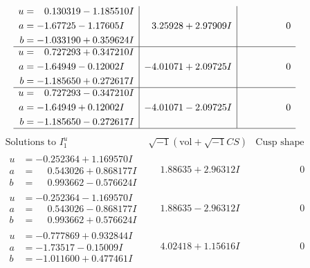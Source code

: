 \documentclass[1p]{elsarticle_modified}
\theoremstyle{definition}
\newcommand{\I}{\sqrt{-1}}
\begin{document}
$$\begin{array}{c|c|c}
\begin{aligned}
u &= \phantom{-}0.130319 - 1.185510 I \\
a &= -1.67725 - 1.17605 I \\
b &= -1.033190 + 0.359624 I\end{aligned}
 & \phantom{-}3.25928 + 2.97909 I & \phantom{-0.000000 } 0 \\ \hline\begin{aligned}
u &= \phantom{-}0.727293 + 0.347210 I \\
a &= -1.64949 - 0.12002 I \\
b &= -1.185650 + 0.272617 I\end{aligned}
 & -4.01071 + 2.09725 I & \phantom{-0.000000 } 0 \\ \hline\begin{aligned}
u &= \phantom{-}0.727293 - 0.347210 I \\
a &= -1.64949 + 0.12002 I \\
b &= -1.185650 - 0.272617 I\end{aligned}
 & -4.01071 - 2.09725 I & \phantom{-0.000000 } 0\\
 \hline 
 \end{array}$$\newpage$$\begin{array}{c|c|c}  
\text{Solutions to }I^u_{1}& \I (\text{vol} + \sqrt{-1}CS) & \text{Cusp shape}\\
 \hline 
\begin{aligned}
u &= -0.252364 + 1.169570 I \\
a &= \phantom{-}0.543026 + 0.868177 I \\
b &= \phantom{-}0.993662 - 0.576624 I\end{aligned}
 & \phantom{-}1.88635 + 2.96312 I & \phantom{-0.000000 } 0 \\ \hline\begin{aligned}
u &= -0.252364 - 1.169570 I \\
a &= \phantom{-}0.543026 - 0.868177 I \\
b &= \phantom{-}0.993662 + 0.576624 I\end{aligned}
 & \phantom{-}1.88635 - 2.96312 I & \phantom{-0.000000 } 0 \\ \hline\begin{aligned}
u &= -0.777869 + 0.932844 I \\
a &= -1.73517 - 0.15009 I \\
b &= -1.011600 + 0.477461 I\end{aligned}
 & \phantom{-}4.02418 + 1.15616 I & \phantom{-0.000000 } 0 \\ \hline\begin{aligned}

\end{aligned}
\end{array}$$
\end{document}
